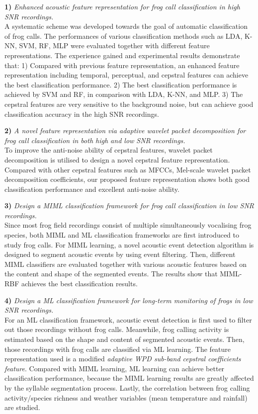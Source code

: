 	
\textbf{1)} \textit{Enhanced acoustic feature representation for frog call classification in high SNR recordings.} 
\\
A systematic scheme was developed towards the goal of automatic classification of frog calls. The performances of various classification methods such as LDA, K-NN, SVM, RF, MLP were evaluated together with different feature representations. The experience gained and experimental results demonstrate that: 1) Compared with previous feature representation, an enhanced feature representation including temporal, perceptual, and cepstral features can achieve the best classification performance. 2) The best classification performance is achieved by SVM and RF, in comparison with LDA, K-NN, and MLP. 3) The cepstral features are very sensitive to the background noise, but can achieve good classification accuracy in the high SNR recordings. 

\textbf{2)} \textit{A novel feature representation via adaptive wavelet packet decomposition for frog call classification in both high and low SNR recordings.}
\\
To improve the anti-noise ability of cepstral features, wavelet packet decomposition is utilised to design a novel cepstral feature representation. Compared with other cepstral features such as MFCCs, Mel-scale wavelet packet decomposition coefficients, our proposed feature representation shows both good classification performance and excellent anti-noise ability. 



\textbf{3)}  \textit{Design a MIML classification framework for frog call classification in low SNR recordings.} 
\\
Since most frog field recordings consist of multiple simultaneously vocalising frog species, both MIML and ML classification frameworks are first introduced to study frog calls. For MIML learning, a novel acoustic event detection algorithm is designed to segment acoustic events by using event filtering. Then, different MIML classifiers are evaluated together with various acoustic features based on the content and shape of the segmented events. The results show that MIML-RBF achieves the best classification results. 


\textbf{4)}  \textit{Design a ML classification framework for long-term monitoring of frogs in low SNR recordings.} 
\\
For an ML classification framework, acoustic event detection is first used to filter out those recordings without frog calls. Meanwhile, frog calling activity is estimated based on the shape and content of segmented acoustic events. Then, those recordings with frog calls are classified via ML learning. The feature representation used is a modified \textit{adaptive WPD sub-band cepstral coefficients feature}. Compared with MIML learning, ML learning can achieve better classification performance, because the MIML learning results are greatly affected by the syllable segmentation process. Lastly, the correlation between frog calling activity/species richness and weather variables (mean temperature and rainfall) are studied.

